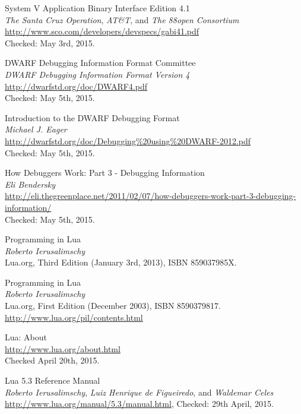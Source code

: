 
\begin{thebibliography}{99}

		System V Application Binary Interface Edition 4.1 \\
		\emph{The Santa Cruz Operation}, \emph{AT\&T}, and \emph{The 88open Consortium} \\
		\url{http://www.sco.com/developers/devspecs/gabi41.pdf} \\
		Checked: May 3rd, 2015.

		DWARF Debugging Information Format Committee \\
		\emph{DWARF Debugging Information Format Version 4} \\
		\url{http://dwarfstd.org/doc/DWARF4.pdf} \\
		Checked: May 5th, 2015.

		Introduction to the DWARF Debugging Format \\
		\emph{Michael J. Eager} \\
		\url{http://dwarfstd.org/doc/Debugging\%20using\%20DWARF-2012.pdf} \\
		Checked: May 5th, 2015.

		How Debuggers Work: Part 3 - Debugging Information \\
		\emph{Eli Bendersky} \\
		\url{http://eli.thegreenplace.net/2011/02/07/how-debuggers-work-part-3-debugging-information/} \\
		Checked: May 5th, 2015.

		Programming in Lua \\
		\emph{Roberto Ierusalimschy} \\
		Lua.org, Third Edition (January 3rd, 2013), ISBN 859037985X.

		Programming in Lua \\
		\emph{Roberto Ierusalimschy} \\
		Lua.org, First Edition (December 2003), ISBN 8590379817. \\
		\url{http://www.lua.org/pil/contents.html}

		Lua: About \\
		\url{http://www.lua.org/about.html} \\
		Checked April 20th, 2015.

		Lua 5.3 Reference Manual \\
		\emph{Roberto Ierusalimschy}, \emph{Luiz Henrique de Figueiredo}, and
		\emph{Waldemar Celes} \\
		\url{http://www.lua.org/manual/5.3/manual.html},
		Checked: 29th April, 2015.


\end{thebibliography}
